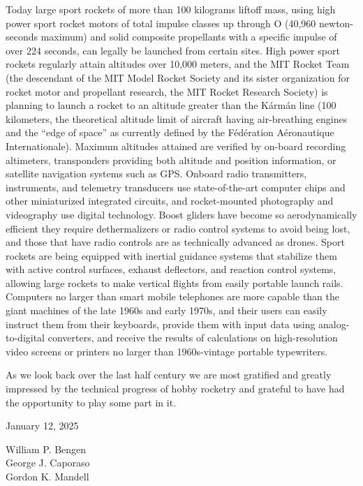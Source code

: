 Today large sport rockets of more than 100 kilograms liftoff mass, using high power sport rocket
motors of total impulse classes up through O (40,960 newton-seconds maximum) and solid composite
propellants with a specific impulse of over 224 seconds, can legally be launched from certain sites.
High power sport rockets regularly attain altitudes over 10,000 meters, and the MIT Rocket Team (the
descendant of the MIT Model Rocket Society and its sister organization for rocket motor and
propellant research, the MIT Rocket Research Society) is planning to launch a rocket to an altitude
greater than the K\'arm\'an line (100 kilometers, the theoretical altitude limit of aircraft having
air-breathing engines and the ``edge of space'' as currently defined by the F\'ed\'eration
A\'eronautique Internationale). Maximum altitudes attained are verified by on-board recording
altimeters, transponders providing both altitude and position information, or satellite navigation
systems such as GPS. Onboard radio transmitters, instruments, and telemetry transducers use
state-of-the-art computer chips and other miniaturized integrated circuits, and rocket-mounted
photography and videography use digital technology. Boost gliders have become so aerodynamically
efficient they require dethermalizers or radio control systems to avoid being lost, and those that
have radio controls are as technically advanced as drones. Sport rockets are being equipped with
inertial guidance systems that stabilize them with active control surfaces, exhaust deflectors, and
reaction control systems, allowing large rockets to make vertical flights from easily portable launch
rails. Computers no larger than smart mobile telephones are more capable than the giant machines of
the late 1960s and early 1970s, and their users can easily instruct them from their keyboards,
provide them with input data using analog-to-digital converters, and receive the results of
calculations on high-resolution video screens or printers no larger than 1960s-vintage portable
typewriters.

As we look back over the last half century we are most gratified and greatly impressed by the
technical progress of hobby rocketry and grateful to have had the opportunity to play some part in
it.

\bigskip
\noindent January 12, 2025

\bigskip
\noindent William P. Bengen\\
George J. Caporaso\\
Gordon K. Mandell

